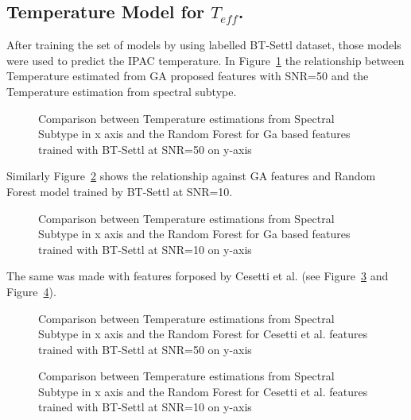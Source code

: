 \subsection{Temperature Model for $T_{eff}$.}
\label {ssub:teff_model}
{
After training the set of models by using labelled BT-Settl dataset, those models 
were used to predict the IPAC temperature.
In Figure~\ref{fig:t50ga_tsb} the relationship between Temperature estimated from 
GA proposed features with SNR=50 and the Temperature estimation 
from spectral subtype.

\begin {figure}
 \begin{center}
 \caption{Comparison between Temperature estimations from Spectral Subtype 
 in x axis and the Random Forest for Ga based features trained with BT-Settl 
 at SNR=50 on y-axis}
 \label{fig:t50ga_tsb}
 \end{center}
\end {figure}

Similarly Figure~\ref{fig:t10ga_tsb} shows the relationship against GA features 
and Random Forest model trained by BT-Settl at SNR=10.
\begin {figure}
 \begin{center}
 \caption{Comparison between Temperature estimations from Spectral Subtype 
 in x axis and the Random Forest for Ga based features trained with BT-Settl 
 at SNR=10 on y-axis}
 \label{fig:t10ga_tsb}
 \end{center}
\end {figure}

The same was made with features forposed by Cesetti et al. 
(see Figure~\ref{fig:t50cs_tsb} and Figure~\ref{fig:t10cs_tsb}).

\begin {figure}
 \begin{center}
 \caption{Comparison between Temperature estimations from Spectral Subtype 
 in x axis and the Random Forest for Cesetti et al. features trained with BT-Settl 
 at SNR=50 on y-axis}
 \label{fig:t50cs_tsb}
 \end{center}
\end {figure}

\begin {figure}
 \begin{center}
 \caption{Comparison between Temperature estimations from Spectral Subtype 
 in x axis and the Random Forest for Cesetti et al. features trained with BT-Settl 
 at SNR=10 on y-axis}
 \label{fig:t10cs_tsb}
 \end{center}
\end {figure}

}
